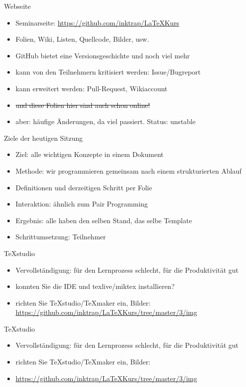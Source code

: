 \begin{frame}{Webseite}
\begin{itemize}[<+->]
    \item Seminarseite: \href{https://github.com/inktrap/LaTeXKurs}{https://github.com/inktrap/LaTeXKurs}
    \item Folien, Wiki, Listen, Quellcode, Bilder, usw.
    \item GitHub bietet eine Versionsgeschichte und noch viel mehr
    \item kann von den Teilnehmern kritisiert werden: Issue/Bugreport
    \item kann erweitert werden: Pull-Request, Wikiaccount
    \item \st{und diese Folien hier sind auch schon online!}
    \item aber: häufige Änderungen, da viel passiert. Status: unstable
\end{itemize}
\end{frame}

\begin{frame}{Ziele der heutigen Sitzung}
    \begin{itemize}[<+->]
    \item Ziel: alle wichtigen Konzepte in einem Dokument
    \item Methode: wir programmieren gemeinsam nach einem strukturierten Ablauf
    \item Definitionen und derzeitigen Schritt per Folie
    \item Interaktion: ähnlich zum Pair Programming
    \item Ergebnis: alle haben den selben Stand, das selbe Template
    \item Schrittumsetzung: Teilnehmer
    \end{itemize}
\end{frame}

\begin{frame}{TeXstudio}
    \begin{itemize}
        \item Vervollständigung: für den Lernprozess schlecht, für die Produktivität gut
        \item konnten Sie die IDE und texlive/miktex installieren?
        \item richten Sie TeXstudio/TeXmaker ein, Bilder: \href{https://github.com/inktrap/LaTeXKurs/tree/master/3/img}{https://github.com/inktrap/LaTeXKurs/tree/master/3/img}
    \end{itemize}
\end{frame}

\begin{frame}{TeXstudio}
    \begin{itemize}
        \item Vervollständigung: für den Lernprozess schlecht, für die Produktivität gut
        \item richten Sie TeXstudio/TeXmaker ein, Bilder:
        \item \href{https://github.com/inktrap/LaTeXKurs/tree/master/3/img}{https://github.com/inktrap/LaTeXKurs/tree/master/3/img}
    \end{itemize}
\end{frame}
